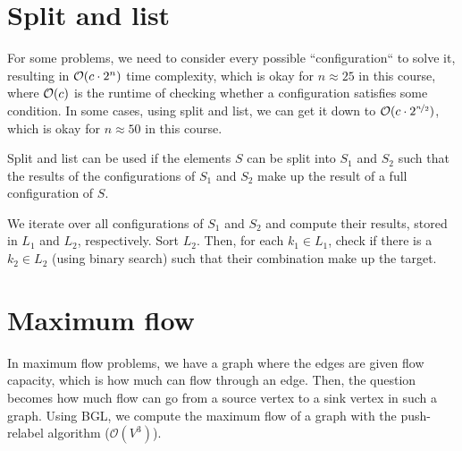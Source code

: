\documentclass[justified,nobib]{tufte-handout}
\begin{document}
\section{Split and list}


For some problems, we need to consider every possible ``configuration`` to
solve it, resulting in $\bigo{c \cdot 2^n}$ time complexity, which is okay for
$n \approx 25$ in this course, where $\bigo{c}$ is the runtime of checking
whether a configuration satisfies some condition. In some cases, using split
and list, we can get it down to $\mathcal{O}(c \cdot 2^{\nicefrac{n}{2}})$,
which is okay for $n \approx 50$ in this course.

Split and list can be used if the elements $S$ can be split into $S_1$ and
$S_2$ such that the results of the configurations of $S_1$ and $S_2$ make up
the result of a full configuration of $S$.

We iterate over all configurations of $S_1$ and $S_2$ and compute their
results, stored in $L_1$ and $L_2$, respectively. Sort $L_2$. Then, for each
$k_1\in L_1$, check if there is a $k_2 \in L_2$ (using binary search) such that
their combination make up the target.

\section{Maximum flow}


In maximum flow problems, we have a graph where the edges are given flow
capacity, which is how much can flow through an edge. Then, the question
becomes how much flow can go from a source vertex to a sink vertex in such a
graph. Using BGL, we compute the maximum flow of a graph with the push-relabel
algorithm ($\mathcal{O}(V^3)$).
\end{document}
